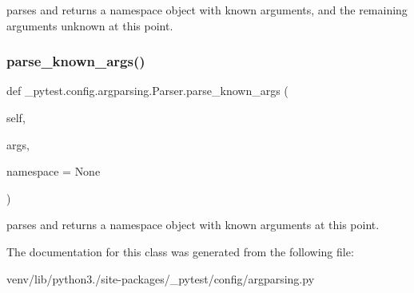 \begin{DoxyVerb}parses and returns a namespace object with known arguments, and
the remaining arguments unknown at this point.
\end{DoxyVerb}
 \mbox{\label{class__pytest_1_1config_1_1argparsing_1_1_parser_a470e379f33643965fe9a019c319c10d8}} 
\subsubsection{\texorpdfstring{parse\+\_\+known\+\_\+args()}{parse\_known\_args()}}
{\footnotesize\ttfamily def \+\_\+pytest.\+config.\+argparsing.\+Parser.\+parse\+\_\+known\+\_\+args (\begin{DoxyParamCaption}\item[{}]{self,  }\item[{}]{args,  }\item[{}]{namespace = {\ttfamily None} }\end{DoxyParamCaption})}

\begin{DoxyVerb}parses and returns a namespace object with known arguments at this
point.
\end{DoxyVerb}
 

The documentation for this class was generated from the following file\+:\begin{DoxyCompactItemize}
\item 
venv/lib/python3./site-\/packages/\+\_\+pytest/config/argparsing.\+py\end{DoxyCompactItemize}
